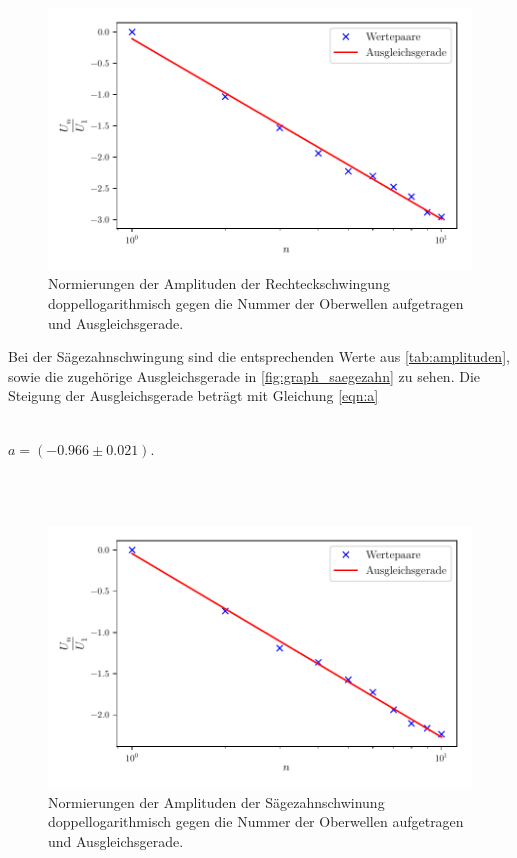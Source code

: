 \begin{figure}
  \centering
  \includegraphics{build/rechteck.pdf}
  \caption{Normierungen der Amplituden der Rechteckschwingung doppellogarithmisch gegen die Nummer der Oberwellen aufgetragen und Ausgleichsgerade.}
  \label{fig:graph_rechteck}
\end{figure}
Bei der Sägezahnschwingung sind die entsprechenden Werte aus \autoref{tab:amplituden}, sowie die zugehörige Ausgleichsgerade
in \autoref{fig:graph_saegezahn} zu sehen. 
Die Steigung der Ausgleichsgerade beträgt mit Gleichung \eqref{eqn:a}
\\ \\ 
\centerline{$ a = (- 0.966 \pm 0.021)$.}
\\ \\
\begin{figure}
  \centering
  \includegraphics{build/saegezahn.pdf}
  \caption{Normierungen der Amplituden der Sägezahnschwinung doppellogarithmisch gegen die Nummer der Oberwellen aufgetragen und Ausgleichsgerade.}
  \label{fig:graph_saegezahn}
\end{figure}

